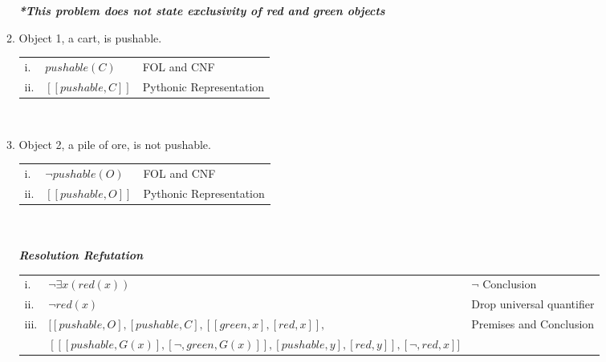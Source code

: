 \documentclass{article}
\begin{document}
\begin{enumerate}
\begin{enumerate}
\begin{tabular}{lll}
        \end{tabular}\\\\
        \textit{\textbf{*This problem does not state exclusivity of red and green objects}}
        \item Object 1, a cart, is pushable.\\
        \begin{tabular}{lll}
            i. & $pushable(C)$ & FOL and CNF\\
            ii. & $[[pushable, C]]$  & Pythonic Representation
        \end{tabular}\\

        \item Object 2, a pile of ore, is not pushable.\\
        \begin{tabular}{lll}
            i. & $\neg pushable(O)$ & FOL and CNF\\
            ii. & $[[pushable, O]]$  & Pythonic Representation
        \end{tabular}\\\\
        \textit{\textbf{Resolution Refutation}}\\
        \begin{tabular}{lll}
            i. & $\neg \exists x(red(x))$ & $\neg$ Conclusion\\
            ii. & $\neg red(x)$ & Drop universal quantifier\\
            iii. & $[[pushable, O],[pushable, C],[[green,x],[red,x]],$ & Premises and Conclusion\\
                & $[[[pushable, G(x)], [\neg, green, G(x)]], [pushable,y], [red,y]], [\neg, red, x]]$
        \end{tabular}\\\\
    \end{enumerate}


\end{enumerate}
\end{document}
